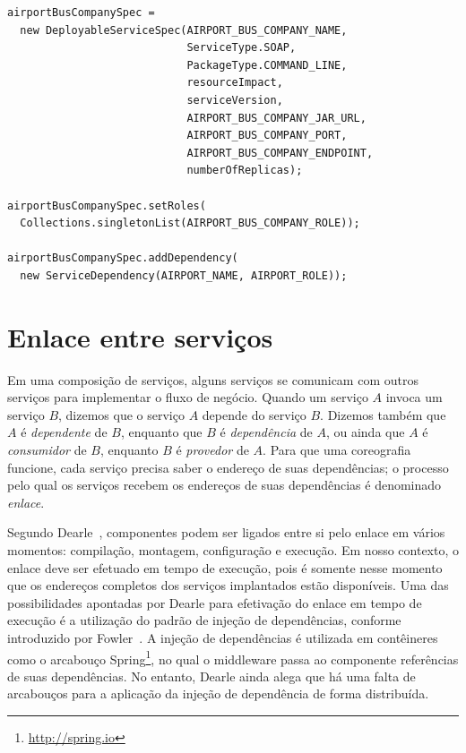 \newpage

\lstset{
language=Java,
}

{\scriptsize
\begin{lstlisting}[breaklines, caption={Trecho da especificação de uma coreografia.}, label={lst:service_spec}]
airportBusCompanySpec =
  new DeployableServiceSpec(AIRPORT_BUS_COMPANY_NAME, 
  							ServiceType.SOAP, 
  							PackageType.COMMAND_LINE, 
  							resourceImpact, 
  							serviceVersion, 
  							AIRPORT_BUS_COMPANY_JAR_URL, 
  							AIRPORT_BUS_COMPANY_PORT, 
  							AIRPORT_BUS_COMPANY_ENDPOINT, 
  							numberOfReplicas);

airportBusCompanySpec.setRoles(
  Collections.singletonList(AIRPORT_BUS_COMPANY_ROLE));

airportBusCompanySpec.addDependency(
  new ServiceDependency(AIRPORT_NAME, AIRPORT_ROLE));
\end{lstlisting}
}

\section{Enlace entre serviços}
\label{sec:ligacao}

Em uma composição de serviços, alguns serviços se comunicam com outros serviços para implementar o fluxo de negócio.
Quando um serviço $A$ invoca um serviço $B$, dizemos que o serviço $A$ depende do serviço $B$. 
Dizemos também que $A$ é \emph{dependente} de $B$, enquanto que $B$ é \emph{dependência} de $A$,
ou ainda que $A$ é \emph{consumidor} de $B$, enquanto $B$ é \emph{provedor} de $A$.
Para que uma coreografia funcione, cada serviço precisa saber o endereço de suas dependências;
o processo pelo qual os serviços recebem os endereços de suas dependências é denominado \emph{enlace}.

Segundo Dearle~\cite{Dearle2007PastPresentFuture}, componentes podem ser ligados entre si pelo enlace em vários momentos: compilação, montagem, configuração e execução. Em nosso contexto, o enlace deve ser efetuado em tempo de execução, pois é somente nesse momento que os endereços completos dos serviços implantados estão disponíveis. Uma das possibilidades apontadas por Dearle para efetivação do enlace em tempo de execução é a utilização do padrão de injeção de dependências, conforme introduzido por Fowler~\cite{Fowler2004Inversion}. A injeção de dependências é utilizada em contêineres como o arcabouço Spring\footnote{\url{http://spring.io}}, no qual o middleware passa ao componente referências de suas dependências. No entanto, Dearle ainda alega que há uma falta de arcabouços para a aplicação da injeção de dependência de forma distribuída.

